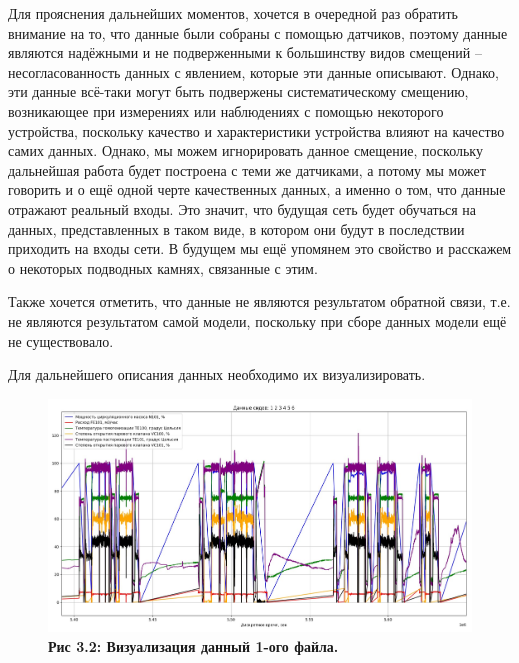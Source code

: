 {  \par \redline Для прояснения дальнейших моментов, хочется в очередной раз обратить внимание на то, что данные были собраны с помощью датчиков, поэтому данные являются надёжными и не подверженными к большинству видов смещений – несогласованность данных с явлением, которые эти данные описывают.  Однако, эти данные всё-таки могут быть подвержены систематическому смещению, возникающее при измерениях или наблюдениях с помощью некоторого устройства, поскольку качество и характеристики устройства влияют на качество самих данных. Однако, мы можем игнорировать данное смещение, поскольку дальнейшая работа будет построена с теми же датчиками, а потому мы может говорить и о ещё одной черте качественных данных, а именно о том, что данные отражают реальный входы. Это значит, что будущая сеть будет обучаться на данных, представленных в таком виде, в котором они будут в последствии приходить на входы сети. В будущем мы ещё упомянем это свойство и расскажем о некоторых подводных камнях, связанные с этим.

  \par \redline Также хочется отметить, что данные не являются результатом обратной связи, т.е. не являются результатом самой модели, поскольку при сборе данных модели ещё не существовало.

  \par \redline Для дальнейшего описания данных необходимо их визуализировать.

  \begin{figure}
    \centering
    \def\svgwidth{\textwidth}
    \includegraphics[width=\textwidth]{images/data_1_visual.jpg}
    \caption{\bfseries Рис 3.2: Визуализация данный 1-ого файла.}
    \label{fig:NNBlackBox}
  \end{figure}

}
